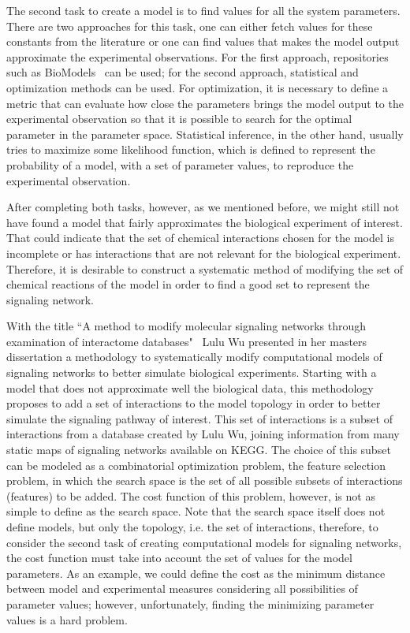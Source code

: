 The second task to create a model is to find values for all the system
parameters. There are two approaches for this task, one can either 
fetch values for these constants from the literature or one can find 
values that makes the model output approximate the experimental 
observations. For the first approach, repositories such as 
BioModels~\cite{le2006biomodels} can be used; for the second approach, 
statistical and optimization methods can be used. For optimization, it 
is necessary to define a metric that can evaluate how close the 
parameters brings the model output to the experimental observation so
that it is possible to search for the optimal parameter in the parameter 
space. Statistical inference, in the other hand, usually tries to 
maximize some likelihood function, which is defined to represent the 
probability of a model, with a set of parameter values, to reproduce the 
experimental observation.

After completing both tasks, however, as we mentioned before, we might 
still not have found a model that fairly approximates the biological 
experiment of interest. That could indicate that the set of chemical 
interactions chosen for the model is incomplete or has interactions that
are not relevant for the biological experiment. Therefore, it is 
desirable to construct a systematic method of modifying the set of 
chemical reactions of the model in order to find a good set to represent 
the signaling network.

With the title ``A method to modify molecular signaling networks through
examination of interactome databases"~\cite{Wu15} Lulu Wu presented in 
her masters dissertation a methodology to systematically modify 
computational models of signaling networks to better simulate biological 
experiments. Starting with a model that does not approximate well the 
biological data, this methodology proposes to add a set of interactions
to the model topology in order to better simulate the signaling pathway 
of interest. This set of interactions is a subset of interactions from a 
database created by Lulu Wu, joining information from many static maps 
of signaling networks available on KEGG. The choice of this subset can 
be modeled as a combinatorial optimization problem, the feature 
selection problem, in which the search space is the set of all possible 
subsets of interactions (features) to be added. The cost function of 
this problem, however, is not as simple to define as the search space. 
Note that the search space itself does not define models, but only the 
topology, i.e. the set of interactions, therefore, to consider the 
second task of creating computational models for signaling networks, the 
cost function must take into account the set of values for the model 
parameters. As an example, we could define the cost as the minimum 
distance between model and experimental measures considering all 
possibilities of parameter values; however, unfortunately, finding the 
minimizing parameter values is a hard problem.

